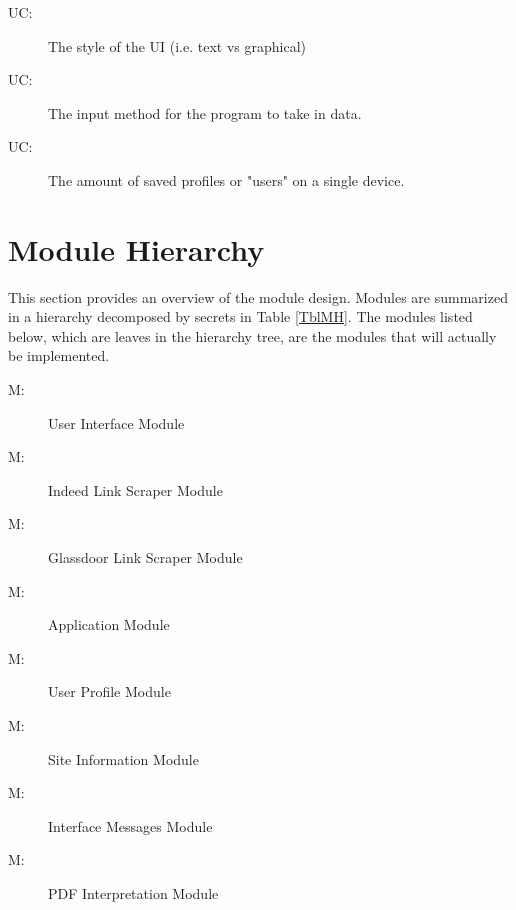 \documentclass[12pt, titlepage]{article}
\newcounter{ucnum}
\newcommand{\uctheucnum}{UC\theucnum}
\newcounter{mnum}
\newcommand{\mthemnum}{M\themnum}
\begin{document}
\begin{description}
\item[ \uctheucnum \label{ucUI}:] 
The style of the UI (i.e. text vs graphical)
\item[ \uctheucnum \label{ucIO}:] 
The input method for the program to take in data.
\item[ \uctheucnum \label{ucUsers}:] 
The amount of saved profiles or "users" on a single device.

\end{description}

\section{Module Hierarchy} \label{SecMH}

This section provides an overview of the module design. Modules are summarized
in a hierarchy decomposed by secrets in Table \ref{TblMH}. The modules listed
below, which are leaves in the hierarchy tree, are the modules that will
actually be implemented. 

\begin{description}
\item [ \mthemnum \label{mUI}:]
    User Interface Module
\item [ \mthemnum \label{mILS}:]
    Indeed Link Scraper Module
\item [ \mthemnum \label{mGLS}:]
    Glassdoor Link Scraper Module
\item [ \mthemnum \label{mA}:]
    Application Module
\item [ \mthemnum \label{mUP}:]
    User Profile Module
\item [ \mthemnum \label{mSI}:]
    Site Information Module
\item [ \mthemnum \label{mIM}:]
    Interface Messages Module
\item [ \mthemnum \label{mPDF}:]
    PDF Interpretation Module
\end{description}
\end{document}
